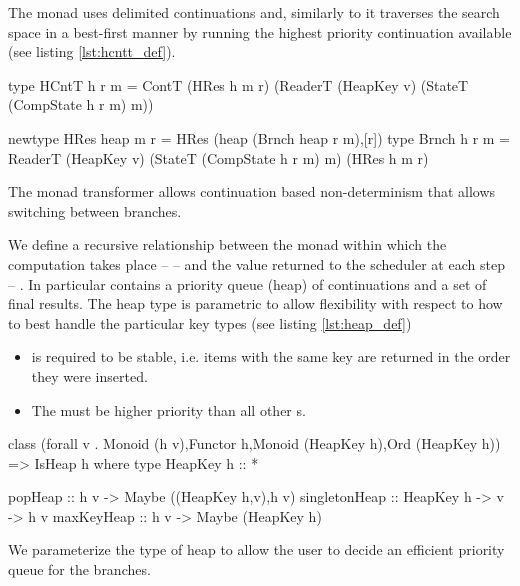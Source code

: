 The  monad uses delimited continuations and, similarly to
\cite{kidneyAlgebrasWeightedSearch2021} it traverses the search space
in a best-first manner by running the highest priority continuation
available (see listing \ref{lst:hcntt_def}).

\begin{code}
\begin{haskellcode}
type HCntT h r m = ContT (HRes h m r)
  (ReaderT (HeapKey v)
   (StateT (CompState h r m) m))

newtype HRes heap m r = HRes (heap (Brnch heap r m),[r])
type Brnch h r m = ReaderT (HeapKey v)
  (StateT (CompState h r m) m) (HRes h m r)
\end{haskellcode}

  \caption{\label{lst:hcntt_def} The  monad transformer
    allows continuation based non-determinism that allows switching
    between branches.}
\end{code}

We define a recursive relationship between the monad within which the computation
takes place --  -- and the value returned to the scheduler at
each step -- . In particular  contains a priority queue
(heap) of continuations and a set of final results. The heap type is parametric to allow
flexibility with respect to how to best handle the particular key
types (see listing \ref{lst:heap_def})

\begin{itemize}
\item is required to be stable,
i.e. items with the same key are returned in the order they were
inserted.
\item The   must be higher priority than all
other s.
\end{itemize}
\begin{code}
\begin{haskellcode}
class (forall v . Monoid (h v),Functor h,Monoid (HeapKey h),Ord (HeapKey h))
  => IsHeap h where
  type HeapKey h :: *

  popHeap :: h v -> Maybe ((HeapKey h,v),h v)
  singletonHeap :: HeapKey h -> v -> h v
  maxKeyHeap :: h v -> Maybe (HeapKey h)
\end{haskellcode}

  \caption{\label{lst:heap_def} We parameterize the type of heap to allow
    the user to decide an efficient priority queue for the branches.}
\end{code}

